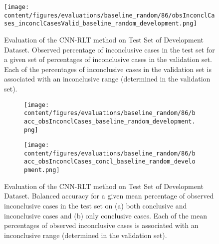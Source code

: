 \begin{figure}[h]
  \centering
  \texttt{[image: content/figures/evaluations/baseline\_random/86/obsInconclCases\_inconclCasesValid\_baseline\_random\_development.png]}
  \caption{Evaluation of the CNN-RLT method on Test Set of Development Dataset.
  Observed percentage of inconclusive cases in the test set 
  for a given set of percentages of inconclusive cases in the validation set.
  Each of the percentages of inconclusive cases in the validation set is associated 
  with an inconclusive range (determined in the validation set).} 
  \label{fig:obsInconclCases_inconclCasesValid_baseline_random_development}
\end{figure} 


\begin{figure}[t]
  \begin{subfigure}{0.9\textwidth}
    \centering
    \texttt{[image: content/figures/evaluations/baseline\_random/86/bacc\_obsInconclCases\_baseline\_random\_development.png]}
    \subcaption{}
    \label{fig:bacc_obsInconclCases_baseline_random_development}
  \end{subfigure}
  \hfill
  \begin{subfigure}{0.9\textwidth}
    \centering
    \texttt{[image: content/figures/evaluations/baseline\_random/86/bacc\_obsInconclCases\_concl\_baseline\_random\_development.png]}
    \subcaption{}
    \label{fig:bacc_obsInconclCases_concl_baseline_random_development}
  \end{subfigure}

  \caption{Evaluation of the CNN-RLT method on Test Set of Development Dataset.
  Balanced accuracy for a given mean percentage of observed inconclusive cases in the test set on 
  (a) both conclusive and inconclusive cases and (b) only conclusive cases. 
  Each of the mean percentages of observed inconclusive cases is associated with an inconclusive range (determined in the validation set). }
  \label{fig:bacc_obsInconclCases_baseline_random_development_full}
\end{figure}




